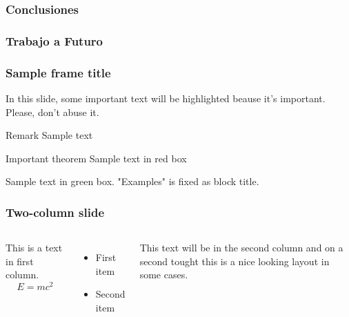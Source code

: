 \documentclass{beamer}
\begin{document}
\begin{frame}
\frametitle{Conclusiones}
\end{frame}





\begin{frame}
\frametitle{Trabajo a Futuro}
\end{frame}





\begin{frame}
\frametitle{Sample frame title}

In this slide, some important text will be
\alert{highlighted} beause it's important.
Please, don't abuse it.

\begin{block}{Remark}
Sample text
\end{block}

\begin{alertblock}{Important theorem}
Sample text in red box
\end{alertblock}

\begin{examples}
Sample text in green box. "Examples" is fixed as block title.
\end{examples}
\end{frame}


\begin{frame}
\frametitle{Two-column slide}

\begin{columns}

This is a text in first column.
$$E=mc^2$$
\begin{itemize}
\item First item
\item Second item
\end{itemize}

This text will be in the second column
and on a second tought this is a nice looking
layout in some cases.
\end{columns}
\end{frame}
\end{document}
